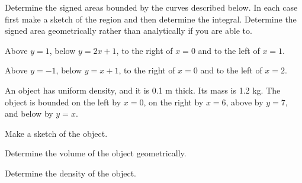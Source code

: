 \begin{problem}
\item Determine the signed areas bounded by the curves described
  below. In each case first make a sketch of the region and then
  determine the integral. Determine the signed area geometrically
  rather than analytically if you are able to.
  \begin{subproblem}
  \item Above $y=1$, below $y=2x+1$, to the right of $x=0$ and to the
    left of $x=1$.
    \vfill
  \item Above $y=-1$, below $y=x+1$, to the right of $x=0$ and to the
    left of $x=2$.
    \vfill
  \end{subproblem}

\clearpage

\item An object has uniform density, and it is 0.1 m thick. Its mass
  is 1.2 kg. The object is bounded on the left by $x=0$, on the right by
  $x=6$, above by $y=7$, and below by $y=x$.
  \begin{subproblem}
    \item Make a sketch of the object.
      \vfill
    \item Determine the volume of the object geometrically.
      \vfill
    \item Determine the density of the object.
      \vfill
  \end{subproblem}


\end{problem}



